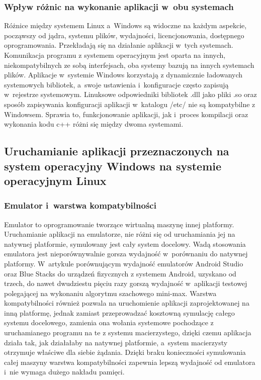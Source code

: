 \subsubsection{Wpływ różnic na wykonanie aplikacji w~obu systemach}
Różnice między systemem Linux a~Windows są widoczne na każdym aspekcie, począwszy od jądra, systemu plików, wydajności, licencjonowania, dostępnego oprogramowania. Przekładają się na działanie aplikacji w~tych systemach. Komunikacja programu z systemem operacyjnym jest oparta na innych, niekompatybilnych ze sobą interfejsach, oba systemy bazują na innych systemach plików. Aplikacje w~systemie Windows korzystają z dynamicznie ładowanych systemowych bibliotek, a~swoje ustawienia i~konfiguracje często zapisują w~rejestrze systemowym. Linuksowe odpowiedniki bibliotek .dll jako pliki .so oraz sposób zapisywania konfiguracji aplikacji w~katalogu /etc/ nie są kompatybilne z Windowsem. Sprawia to, funkcjonowanie aplikacji, jak i~proces kompilacji oraz wykonania kodu c++ różni się między dwoma systemami.

\subsection{Uruchamianie aplikacji przeznaczonych na system operacyjny Windows na systemie operacyjnym Linux}
\subsubsection{Emulator i~warstwa kompatybilności}
Emulator to oprogramowanie tworzące wirtualną maszynę innej platformy. Uruchamianie aplikacji na emulatorze, nie różni się od uruchamiania jej na natywnej platformie, symulowany jest cały system docelowy. Wadą stosowania emulatora jest nieporównywalnie gorsza wydajność w~porównaniu do natywnej platformy. W~artykule\cite{emulatorPerformance} porównującym wydajność emulatorów Android Studio oraz Blue Stacks do urządzeń fizycznych z systemem Android, uzyskano od trzech, do nawet dwudziestu pięciu razy gorszą wydajność w~aplikacji testowej polegającej na wykonaniu algorytmu szachowego mini-max. Warstwa kompatybilności również pozwala na uruchomienie aplikacji zaprojektowanej na inną platformę, jednak zamiast przeprowadzać kosztowną symulację całego systemu docelowego, zamienia ona wołania systemowe pochodzące z uruchamianego programu na te z systemu macierzystego, dzięki czemu aplikacja działa tak, jak działałaby na natywnej platformie, a~system macierzysty otrzymuje właściwe dla siebie żądania. Dzięki braku konieczności symulowania całej maszyny warstwa kompatybilności zapewnia lepszą wydajność od emulatora i~nie wymaga dużego nakładu pamięci.

